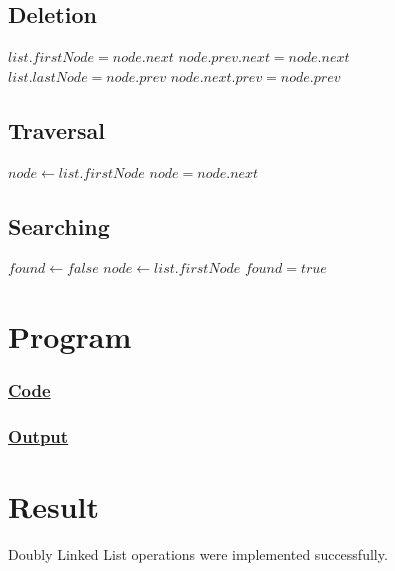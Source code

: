 \subsection{Deletion}

{\Large\color{white}
\begin{algorithmic}[1]
			\State $list.firstNode = node.next$
		\Else
			\State $node.prev.next = node.next$
		\EndIf
			\State $list.lastNode = node.prev$
		\Else
			\State $node.next.prev = node.prev$
		\EndIf
	\EndFunction
\end{algorithmic}
\color{black}}

\subsection{Traversal}

{\Large\color{white}
\begin{algorithmic}[1]
		\State $node \gets list.firstNode$
			\State {}
			\State $node = node.next$
		\EndWhile
	\EndFunction
\end{algorithmic}
\color{black}}

\subsection{Searching}

{\Large\color{white}
\begin{algorithmic}[1]
		\State $found \gets false$
		\State $node \gets list.firstNode$
				\State $found = true$
			\EndIf
		\EndWhile
		\State {}
	\EndFunction
\end{algorithmic}
\color{black}}

\section{Program}

\subsubsection{\underline{Code}}



\subsubsection{\underline{Output}}



\vfill

\section{Result}
{\Large\color{white}
Doubly Linked List operations were implemented successfully.
\color{black}}

\clearpage
